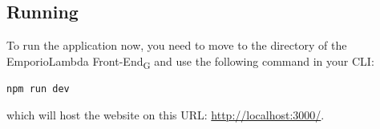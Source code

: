 \subsection{Running}
To run the application now, you need to move to the directory of the EmporioLambda Front-End\textsubscript{G} and use the following command in your CLI:
\begin{center}
\texttt{npm run dev}
\end{center}
which will host the website on this URL: \url{http://localhost:3000/}.